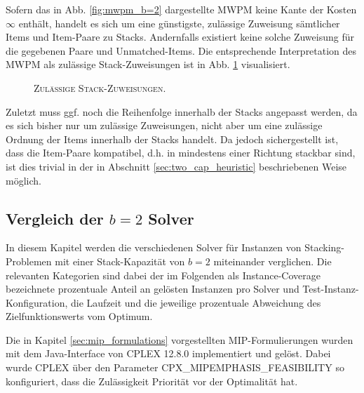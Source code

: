 Sofern das in Abb. \ref{fig:mwpm_b=2} dargestellte \textsc{MWPM} keine Kante der Kosten $\infty$
enthält, handelt es sich um eine günstigste, zulässige Zuweisung sämtlicher Items und Item-Paare
zu Stacks. Andernfalls existiert keine solche Zuweisung für die gegebenen Paare und Unmatched-Items.
Die entsprechende Interpretation des \textsc{MWPM} als zulässige Stack-Zuweisungen ist in Abb.
\ref{fig:stacking_solution} visualisiert.

\begin{figure}[H]
  \centering
    \caption{\textsc{Zulässige Stack-Zuweisungen.}}
    \label{fig:stacking_solution}
\end{figure}

Zuletzt muss ggf. noch die Reihenfolge innerhalb der Stacks angepasst werden, da es sich bisher nur um zulässige Zuweisungen,
nicht aber um eine zulässige Ordnung der Items innerhalb der Stacks handelt.
Da jedoch sichergestellt ist, dass die Item-Paare kompatibel, d.h. in mindestens einer Richtung stackbar sind,
ist dies trivial in der in Abschnitt \ref{sec:two_cap_heuristic} beschriebenen Weise möglich.

\subsection{Vergleich der $b = 2$ Solver}
\label{sec:solver_comp_b=2}

In diesem Kapitel werden die verschiedenen Solver für Instanzen von Stacking-Problemen mit einer Stack-Kapazität von $b=2$ miteinander verglichen. Die relevanten Kategorien sind dabei der im Folgenden als Instance-Coverage bezeichnete prozentuale Anteil an gelösten Instanzen pro Solver und Test-Instanz-Konfiguration, die Laufzeit und die jeweilige prozentuale Abweichung des Zielfunktionswerts vom Optimum.

Die in Kapitel \ref{sec:mip_formulations} vorgestellten MIP-Formulierungen wurden mit dem Java-Interface von CPLEX 12.8.0 implementiert
und gelöst. Dabei wurde CPLEX über den Parameter \textsc{CPX\_MIPEMPHASIS\_FEASIBILITY} so konfiguriert, dass die Zulässigkeit
Priorität vor der Optimalität hat.\cite{IBM_DOC}

